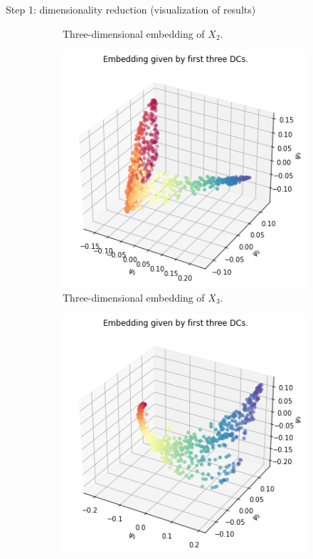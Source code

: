\documentclass[xcolor={dvipsnames,svgnames}]{beamer}
\begin{document}
\begin{frame}{Step 1: dimensionality reduction (visualization of results)}
\begin{figure}[H]
\begin{subfigure}[b]{0.3\textwidth}
    \caption{Three-dimensional embedding of $X_2$.}
\end{subfigure}
\hfill
\begin{subfigure}[b]{0.3\textwidth}
    \includegraphics[width=\textwidth]{figures/X3_embedding.png}
    \caption{Three-dimensional embedding of $X_3$.}
\end{subfigure}
\hfill
\begin{subfigure}[b]{0.3\textwidth}
    \includegraphics[width=\textwidth]{figures/X4_embedding.png}

\end{subfigure}
\end{figure}
\end{frame}
\end{document}
